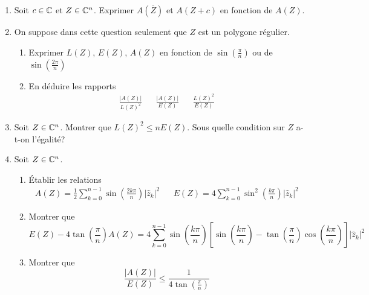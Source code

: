 \begin{enumerate}
 \item Soit $c\in \mathbb{C}$ et $Z\in \mathbb{C}^n$. Exprimer $A(\overline{Z})$ et $A(Z+c)$ en fonction de $A(Z)$.
\item On suppose dans cette question seulement que $Z$ est un polygone régulier.
\begin{enumerate}
 \item Exprimer $L(Z)$, $E(Z)$, $A(Z)$ en fonction de $\sin\left( \frac{\pi}{n}\right)$ ou de $\sin\left( \frac{2\pi}{n}\right)$  
 \item En déduire les rapports
\begin{align*}
 \frac{|A(Z)|}{L(Z)^2} & & \frac{|A(Z)|}{E(Z)} & & \frac{L(Z)^2}{E(Z)} 
\end{align*}
\end{enumerate}
 
 \item Soit $Z\in \mathbb{C}^n$. Montrer que $L(Z)^2 \leq nE(Z)$. Sous quelle condition sur $Z$ a-t-on l'égalité?
 \item Soit $Z\in \mathbb{C}^n$.
\begin{enumerate}
 \item \'Etablir les relations
\begin{align*}
 A(Z) = \frac{1}{2}\sum_{k=0}^{n-1}\sin\left( \frac{2k\pi}{n}\right)|\widehat{z}_k|^2 & & 
 E(Z) = 4\sum_{k=0}^{n-1}\sin^2\left( \frac{k\pi}{n}\right)|\widehat{z}_k|^2
\end{align*}
\item Montrer que 
\begin{displaymath}
 E(Z) - 4 \tan\left( \frac{\pi}{n}\right)A(Z)
=
4 \sum_{k=0}^{n-1}\sin\left( \frac{k\pi}{n}\right)
\left[
\sin\left( \frac{k\pi}{n}\right) - \tan\left( \frac{\pi}{n}\right)\cos\left( \frac{k\pi}{n}\right)
 \right]
|\widehat{z}_k|^2
\end{displaymath}
\item Montrer que 
\begin{displaymath}
\frac{|A(Z)|}{E(Z)}\leq \frac{1}{4\tan\left( \frac{\pi}{n}\right) } 
\end{displaymath}
\end{enumerate}


\end{enumerate}
